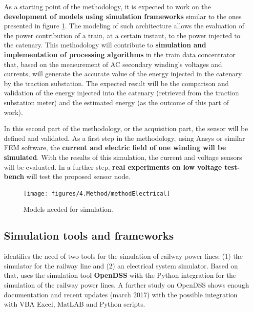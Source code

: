 As a starting point of the methodology, it is expected to work on the \textbf{development of models using simulation frameworks} similar to the ones presented in figure \ref{fig:4.methodElectrical}. The modeling of such architecture allows the evaluation of the power contribution of a train, at a certain instant, to the power injected to the catenary. This methodology will contribute to \textbf{simulation and implementation of processing algorithms} in the train data concentrator that, based on the measurement of \ac{AC} secondary winding's voltages and currents, will generate the accurate value of the energy injected in the catenary by the traction substation. The expected result will be the comparison and validation of the energy injected into the catenary (retrieved from the traction substation meter) and the estimated energy (as the outcome of this part of work).

In this second part of the methodology, or the acquisition part, the sensor will be defined and validated. As a first step in the methodology, using Ansys or similar \ac{FEM} software, the \textbf{current and electric field of one winding will be simulated}. With the results of this simulation, the current and voltage sensors will be evaluated. In a further step, \textbf{real experiments on low voltage test-bench} will test the proposed sensor node.



\begin{figure}[h!]
	\centering
	\texttt{[image: figures/4.Method/methodElectrical]}
	\caption{Models needed for simulation.}
	\label{fig:4.methodElectrical}
\end{figure}



\subsection{Simulation tools and frameworks}

\cite{pilo2000} identifies the need of two tools for the simulation of railway power lines: (1) the simulator for the railway line and (2) an electrical system simulator. Based on that, \cite{almagro2017} uses the simulation tool \textbf{OpenDSS} with the Python integration for the simulation of the railway power lines. A further study on OpenDSS shows enough documentation and recent updates (march 2017) with the possible integration with VBA Excel, MatLAB and Python scripts.

